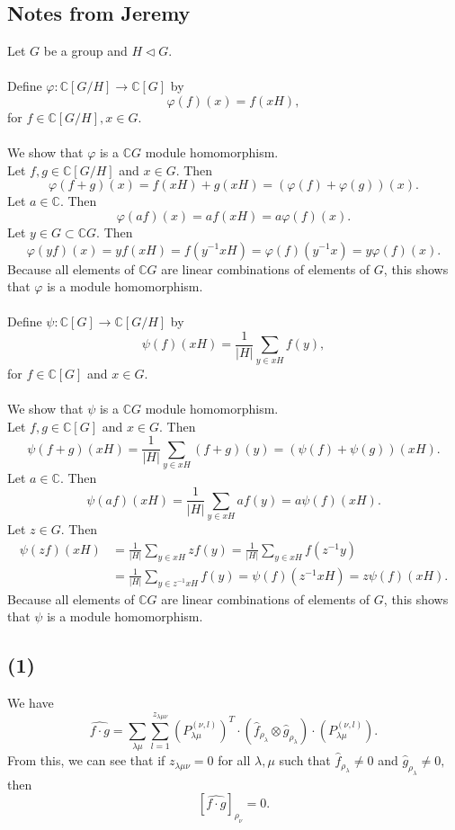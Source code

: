 \documentclass[10pt,reqno]{amsart}
\renewcommand{\phi}{\varphi}
\newcommand{\C}{\mathbb{C}}
\theoremstyle{definition}
\numberwithin{equation}{section}
\begin{document}
\subsection{Notes from Jeremy}
Let $G$ be a group and $H \lhd G$.\\\\
Define $\phi: \C[G/H] \to \C[G]$ by
\[
	\phi(f)(x) = f(xH),
\]
for $f \in \C[G/H], x\in G$.\\\\
We show that $\phi$ is a $\C G$ module homomorphism.\\
Let $f, g \in \C[G/H]$ and $x \in G$. Then
\[
	\phi(f+g)(x) = f(xH) + g(xH) = (\phi(f)+\phi(g))(x).
\]
Let $a \in \C$. Then
\[
	\phi(af)(x) = af(xH) = a\phi(f)(x).
\]
Let $y \in G \subset \C G$. Then
\[
	\phi(yf)(x) = yf(xH) = f(y^{-1}xH) = \phi(f)(y^{-1}x) = y\phi(f)(x).
\]
Because all elements of $\C G$ are linear combinations of elements of $G$, this shows that $\phi$ is a module homomorphism.\\\\
Define $\psi: \C[G] \to \C[G/H]$ by
\[
	\psi(f)(xH) = \frac{1}{|H|} \sum_{y \in xH} f(y),
\]
for $f \in \C[G]$ and $x \in G$.\\\\
We show that $\psi$ is a $\C G$ module homomorphism.\\
Let $f,g \in \C[G]$ and $x \in G$. Then
\[
	\psi(f+g)(xH) =   \frac{1}{|H|} \sum_{y \in xH} (f+g)(y) = (\psi(f)+\psi(g))(xH).
\]
Let $a \in \C$. Then
\[
	\psi(af)(xH) = \frac{1}{|H|} \sum_{y \in xH} af(y) = a\psi(f)(xH).
\]
Let $z \in G$. Then
\begin{align*}
	\psi(zf)(xH) &= \frac{1}{|H|} \sum_{y \in xH} zf(y) = \frac{1}{|H|} \sum_{y \in xH} f(z^{-1}y) \\
	&= \frac{1}{|H|} \sum_{y \in z^{-1}xH} f(y) = \psi(f)(z^{-1}xH) = z\psi(f)(xH).
\end{align*}
Because all elements of $\C G$ are linear combinations of elements of $G$, this shows that $\psi$ is a module homomorphism.



\subsection{(1)}
We have
\[\widehat{f\cdot g}
=
\sum_{\lambda\mu}
\sum_{l=1}^{z_{\lambda \mu \nu}}
(P_{\lambda\mu}^{(\nu, l)})^T
\cdot 
(\widehat{f}_{\rho_\lambda}
\otimes
\widehat{g}_{\rho_\lambda}
)
\cdot
(P_{\lambda\mu}^{(\nu, l)})
.
\]
From this, we can see that
if $z_{\lambda\mu\nu} = 0$
for all $\lambda, \mu$ such that
$\widehat{f}_{\rho_\lambda} \neq 0$
and
$\widehat{g}_{\rho_\lambda} \neq 0,$
then
\[
[\widehat{f\cdot g}]_{\rho_\nu} = 0.
\]
\end{document}
